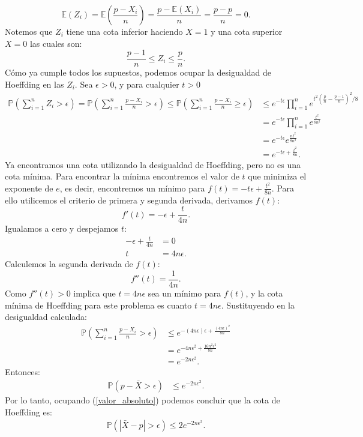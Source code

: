 \documentclass[11pt,letterpaper]{article}
\newcommand{\mP}{\mathbb{P}}
\newcommand{\mE}{\mathbb{E}}
\begin{document}
$$\mE(Z_i)=\mE\left(\frac{p-X_i}{n} \right)=\frac{p-\mE(X_i)}{n}=\frac{p-p}{n}=0.$$
Notemos que $Z_i$ tiene una cota inferior haciendo $X=1$ y una cota superior $X=0$ las cuales son:
$$\frac{p-1}{n}\leq Z_i \leq \frac{p}{n}.$$
Cómo ya cumple todos los supuestos, podemos ocupar la desigualdad de Hoeffding en las $Z_i$. Sea $\epsilon>0$, y para cualquier $t>0$ 
\begin{align*}
\mP\left(\sum_{i=1}^n Z_i>\epsilon\right)=\mP\left(\sum_{i=1}^n\frac{p-X_i}{n}>\epsilon\right)\leq \mP\left(\sum_{i=1}^n\frac{p-X_i}{n}\geq\epsilon\right) &\leq e^{-t\epsilon}\prod_{i=1}^n e^{t^2(\frac{p}{n}-\frac{p-1}{n})^2/8}\\
&=e^{-t\epsilon}\prod_{i=1}^n e^{\frac{t^2}{8n^2}}\\
&=e^{-t\epsilon} e^{\frac{nt^2}{8n^2}}\\
&=e^{-t\epsilon+\frac{t^2}{8n}}.
\end{align*}
Ya encontramos una cota utilizando la desigualdad de Hoeffding, pero no es una cota mínima. Para encontrar la mínima encontremos el valor de $t$ que minimiza el exponente de $e$, es decir, encontremos un mínimo para $f(t)=-t\epsilon+\frac{t^2}{8n}.$ Para ello utilicemos el criterio de primera y segunda derivada, derivamos $f(t)$:
$$f'(t)=-\epsilon +\frac{t}{4n}.$$
Igualamos a cero y despejamos $t$:
\begin{align*}
-\epsilon +\frac{t}{4n} &= 0\\
t&=4n\epsilon.
\end{align*}
Calculemos la segunda derivada de $f(t)$:
$$f''(t)=\frac{1}{4n}.$$
Como $f''(t)>0$ implica que $t=4n\epsilon$ sea un mínimo para $f(t)$, y la cota mínima de Hoeffding para este problema es cuanto $t=4n\epsilon$. Sustituyendo en la desigualdad calculada:
\begin{align*}
\mP\left(\sum_{i=1}^n\frac{p-X_i}{n}>\epsilon\right)&\leq e^{-(4n\epsilon)\epsilon+\frac{(4n\epsilon)^2}{8n}}\\
&= e^{-4n\epsilon^2+\frac{16n^2\epsilon^2}{8n}}\\
&= e^{-2n\epsilon^2}.
\end{align*}
Entonces: 
\begin{align*}
\mP\left(p-\bar{X}>\epsilon\right)&\leq e^{-2n\epsilon^2}.
\end{align*}
Por lo tanto, ocupando (\ref{valor_absoluto}) podemos concluir que la cota de Hoeffding es:
\begin{align*}
\mP\left(|\bar{X}-p|>\epsilon\right)\leq 2e^{-2n\epsilon^2}.
\end{align*}
\end{document}
